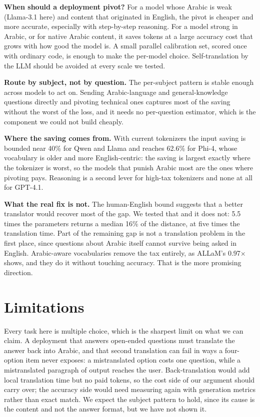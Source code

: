 \documentclass[conference,a4paper]{IEEEtran}
\begin{document}
\textbf{When should a deployment pivot?} For a model whose Arabic is weak
(Llama-3.1 here) and content that originated in English, the pivot is cheaper
and more accurate, especially with step-by-step reasoning. For a model strong
in Arabic, or for native Arabic content, it saves tokens at a large accuracy
cost that grows with how good the model is. A small parallel calibration set,
scored once with ordinary code, is enough to make the per-model choice.
Self-translation by the LLM should be avoided at every scale we tested.

\textbf{Route by subject, not by question.} The per-subject pattern is stable
enough across models to act on. Sending Arabic-language and general-knowledge
questions directly and pivoting technical ones captures most of the saving
without the worst of the loss, and it needs no per-question estimator, which is
the component we could not build cheaply.

\textbf{Where the saving comes from.} With current tokenizers the input saving
is bounded near 40\% for Qwen and Llama and reaches 62.6\% for Phi-4, whose
vocabulary is older and more English-centric: the saving is largest exactly
where the tokenizer is worst, so the models that punish Arabic most are the
ones where pivoting pays. Reasoning is a second lever for high-tax tokenizers
and none at all for GPT-4.1.

\textbf{What the real fix is not.} The human-English bound suggests that a
better translator would recover most of the gap. We tested that and it does
not: 5.5 times the parameters returns a median 16\% of the distance, at five
times the translation time. Part of the remaining gap is not a translation
problem in the first place, since questions about Arabic itself cannot survive
being asked in English. Arabic-aware vocabularies remove the tax entirely, as
ALLaM's 0.97$\times$ shows, and they do it without touching accuracy. That is
the more promising direction.

\section{Limitations}

Every task here is multiple choice, which is the sharpest limit on what we can
claim. A deployment that answers open-ended questions must translate the answer
back into Arabic, and that second translation can fail in ways a four-option
item never exposes: a mistranslated option costs one question, while a
mistranslated paragraph of output reaches the user. Back-translation would add
local translation time but no paid tokens, so the cost side of our argument
should carry over; the accuracy side would need measuring again with generation
metrics rather than exact match. We expect the subject pattern to hold, since
its cause is the content and not the answer format, but we have not shown it.
\end{document}
